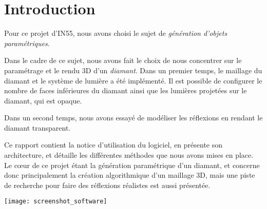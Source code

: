 \section{Introduction}

Pour ce projet d'IN55, nous avons choisi le sujet de \emph{génération
d'objets paramétriques}.

Dans le cadre de ce sujet, nous avons fait le choix de nous concentrer sur le paramétrage
et le rendu 3D d'un \emph{diamant}.
Dans un premier temps, le maillage du diamant et le système de lumière a été implémenté.
Il est possible de configurer le nombre de faces inférieures du diamant ainsi que
les lumières projetées sur le diamant, qui est opaque.

Dans un second temps, nous avons essayé de modéliser les réflexions en rendant le diamant
transparent.

Ce rapport contient la notice d'utilisation du logiciel, en présente son architecture,
et détaille les différentes méthodes que nous avons mises en place.
Le cœur de ce projet étant la génération paramétrique d'un diamant, et concerne
donc principalement la création algorithmique d'un maillage 3D, mais une piste de
recherche pour faire des réflexions réalistes est aussi présentée.

{\centering \texttt{[image: screenshot\_software]}}

